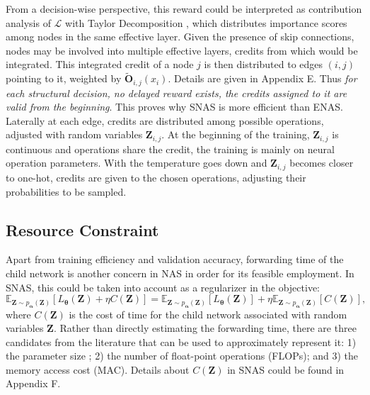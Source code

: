 \documentclass{article} \usepackage{iclr2019_conference,times}
\begin{document}
From a decision-wise perspective, this reward could be interpreted as contribution analysis of $\mathcal{L}$ with Taylor Decomposition \citep{montavon2017explaining}, which distributes importance scores among nodes in the same effective layer. Given the presence of skip connections, nodes may be involved into multiple effective layers, credits from which would be integrated. This integrated credit of a node $j$ is then distributed to edges $(i, j)$ pointing to it, weighted by $\tilde{\bm{O}}_{i, j}(x_{i})$. Details are given in Appendix E. Thus \textit{for each structural decision, no delayed reward exists, the credits assigned to it are valid from the beginning}. This proves why SNAS is more efficient than ENAS. Laterally at each edge, credits are distributed among possible operations, adjusted with random variables $\bm{Z}_{i, j}$. At the beginning of the training, $\bm{Z}_{i, j}$ is continuous and operations share the credit, the training is mainly on neural operation parameters. With the temperature goes down and $\bm{Z}_{i, j}$ becomes closer to one-hot, credits are given to the chosen operations, adjusting their probabilities to be sampled. 

\subsection{Resource Constraint}
Apart from training efficiency and validation accuracy, forwarding time of the child network is another concern in NAS in order for its feasible employment. In SNAS, this could be taken into account as a regularizer in the objective:
\begin{equation}
\mathbb{E}_{\bm{Z}\sim p_{\bm{\alpha}}(\bm{Z})}[L_{\bm{\theta}}(\bm{Z})+\eta C(\bm{Z})]=\mathbb{E}_{\bm{Z}\sim p_{\bm{\alpha}}(\bm{Z})}[L_{\bm{\theta}}(\bm{Z})]+\eta \mathbb{E}_{\bm{Z}\sim p_{\bm{\alpha}}(\bm{Z})}[C(\bm{Z})], 
\end{equation}
where $C(\bm{Z})$ is the cost of time for the child network associated with random variables $\bm{Z}$. Rather than directly estimating the forwarding time, there are three candidates from the literature \citep{gordon2018morphnet, ma2018shufflenet} that can be used to approximately represent it: 1) the parameter size ; 2) the number of float-point operations (FLOPs); and 3) the memory access cost (MAC). Details about $C(\bm{Z})$ in SNAS could be found in Appendix F. 
\end{document}
